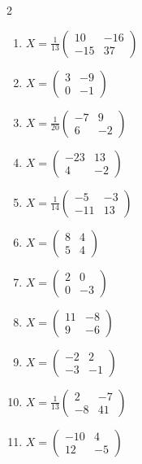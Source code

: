 \begin{multicols}{2}
\begin{enumerate}[label=\arabic*., leftmargin=*, itemsep=1pt]
\item $X=\frac{1}{13}\left(\begin{smallmatrix}10 & -16\\ -15 & 37\end{smallmatrix}\right)$
\item $X=\left(\begin{smallmatrix}3 & -9\\ 0 & -1\end{smallmatrix}\right)$
\item $X=\frac{1}{20}\left(\begin{smallmatrix}-7 & 9\\ 6 & -2\end{smallmatrix}\right)$
\item $X=\left(\begin{smallmatrix}-23 & 13\\ 4 & -2\end{smallmatrix}\right)$
\item $X=\frac{1}{14}\left(\begin{smallmatrix}-5 & -3\\ -11 & 13\end{smallmatrix}\right)$
\item $X=\left(\begin{smallmatrix}8 & 4\\ 5 & 4\end{smallmatrix}\right)$
\item $X=\left(\begin{smallmatrix}2 & 0\\ 0 & -3\end{smallmatrix}\right)$
\item $X=\left(\begin{smallmatrix}11 & -8\\ 9 & -6\end{smallmatrix}\right)$
\item $X=\left(\begin{smallmatrix}-2 & 2\\ -3 & -1\end{smallmatrix}\right)$
\item $X=\frac{1}{13}\left(\begin{smallmatrix}2 & -7\\ -8 & 41\end{smallmatrix}\right)$
\item $X=\left(\begin{smallmatrix}-10 & 4\\ 12 & -5\end{smallmatrix}\right)$

\end{enumerate}
\end{multicols}

